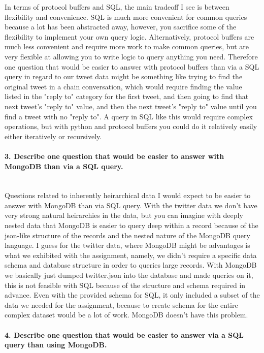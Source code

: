 \documentclass[12pt]{article}
\begin{document}
In terms of protocol buffers and SQL, the main tradeoff I see is between flexibility and convenience.  SQL is much more convenient for common queries because a lot has been abstracted away, however, you sacrifice some of the flexibility to implement your own query logic.  Alternatively, protocol buffers are much less convenient and require more work to make common queries, but are very flexible at allowing you to write logic to query anything you need.  Therefore one question that would be easier to answer with protocol buffers than via a SQL query in regard to our tweet data might be something like trying to find the original tweet in a chain conversation, which would require finding the value listed in the "reply to" category for the first tweet, and then going to find that next tweet's "reply to" value, and then the next tweet's "reply to" value until you find a tweet with no "reply to".  A query in SQL like this would require complex operations, but with python and protocol buffers you could do it relatively easily either iteratively or recursively.    

\paragraph{3. Describe one question that would be easier to answer with MongoDB than via a SQL query.}\mbox{}\\

Questions related to inherently heirarchical data I would expect to be easier to answer with MongoDB than via SQL query. With the twitter data we don't have very strong natural heirarchies in the data, but you can imagine with deeply nested data that MongoDB is easier to query deep within a record because of the json-like structure of the records and the nested nature of the MongoDB query language. I guess for the twitter data, where MongoDB might be advantages is what we exhibited with the assignment, namely, we didn't require a specific data schema and database structure in order to queries large records.  With MongoDB we basically just dumped twitter.json into the database and made queries on it, this is not feasible with SQL because of the structure and schema required in advance. Even with the provided schema for SQL, it only included a subset of the data we needed for the assignment, because to create schema for the entire complex dataset would be a lot of work. MongoDB doesn't have this problem.

\paragraph{4. Describe one question that would be easier to answer via a SQL query than using MongoDB.}\mbox{}\\
\end{document}
